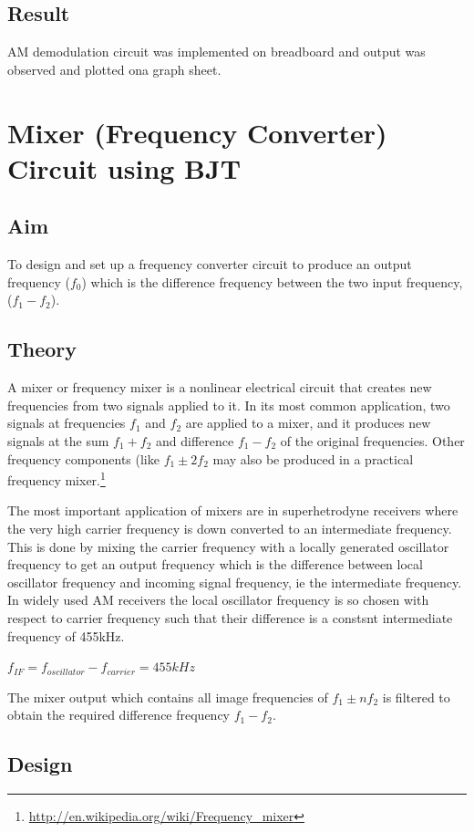 \documentclass{book}
\begin{document}
\section*{Result}

AM demodulation circuit was implemented on breadboard and output was observed and plotted ona graph sheet.

\chapter[Mixer Circuit using BJT]{Mixer (Frequency Converter) Circuit using BJT}
\section*{Aim}
To design and set up a frequency converter circuit to produce an output frequency ($f_0$) which is the difference frequency between the two input frequency, ($f_{1}-f_{2}$).
\section*{Theory}
A mixer or frequency mixer is a nonlinear electrical circuit that creates new frequencies from two signals applied to it. In its most common application, two signals at frequencies $f_1$ and $f_2$ are applied to a mixer, and it produces new signals at the sum $f_1 + f_2$ and difference $f_1 - f_2$ of the original frequencies. Other frequency components (like $f_1 \pm 2f_2$ may also be produced in a practical frequency mixer.\footnote{\url{http://en.wikipedia.org/wiki/Frequency_mixer}}

The most important application of mixers are in superhetrodyne receivers where the very high carrier frequency is down converted to an intermediate frequency. This is done by mixing the carrier frequency with a locally generated oscillator frequency to get an output frequency which is the difference between local oscillator frequency and incoming signal frequency, ie the intermediate frequency. In widely used AM receivers the local oscillator frequency is so chosen with respect to carrier frequency such that their difference is a constsnt intermediate frequency of 455kHz.\\
\begin{center}
$f_{IF}=f_{oscillator}-f_{carrier}=455 kHz$
\end{center}
The mixer output which contains all image frequencies of $f_1 \pm nf_2$ is filtered to obtain the required difference frequency $f_1-f_2$.
\section*{Design}
\end{document}
